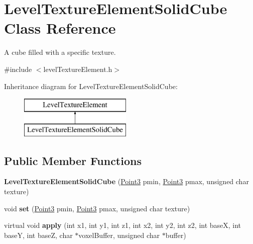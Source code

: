 \hypertarget{classLevelTextureElementSolidCube}{
\section{\-Level\-Texture\-Element\-Solid\-Cube \-Class \-Reference}
\label{d5/d61/classLevelTextureElementSolidCube}
}


\-A cube filled with a specific texture.  




{\ttfamily \#include $<$level\-Texture\-Element.\-h$>$}

\-Inheritance diagram for \-Level\-Texture\-Element\-Solid\-Cube\-:\begin{figure}[H]
\begin{center}
\leavevmode
\includegraphics[height=2.000000cm]{d5/d61/classLevelTextureElementSolidCube}
\end{center}
\end{figure}
\subsection*{\-Public \-Member \-Functions}
\begin{DoxyCompactItemize}
\item 
\hypertarget{classLevelTextureElementSolidCube_a1e3d82f5d320797f24e27606d634d088}{
{\bfseries \-Level\-Texture\-Element\-Solid\-Cube} (\hyperlink{classPoint3}{\-Point3} pmin, \hyperlink{classPoint3}{\-Point3} pmax, unsigned char texture)}
\label{d5/d61/classLevelTextureElementSolidCube_a1e3d82f5d320797f24e27606d634d088}

\item 
\hypertarget{classLevelTextureElementSolidCube_afa3ad50cf33843701072ed572b220e3a}{
void {\bfseries set} (\hyperlink{classPoint3}{\-Point3} pmin, \hyperlink{classPoint3}{\-Point3} pmax, unsigned char texture)}
\label{d5/d61/classLevelTextureElementSolidCube_afa3ad50cf33843701072ed572b220e3a}

\item 
\hypertarget{classLevelTextureElementSolidCube_a0feb1776b7133cefa71dc01714758b1a}{
virtual void {\bfseries apply} (int x1, int y1, int z1, int x2, int y2, int z2, int base\-X, int base\-Y, int base\-Z, char $\ast$voxel\-Buffer, unsigned char $\ast$buffer)}
\label{d5/d61/classLevelTextureElementSolidCube_a0feb1776b7133cefa71dc01714758b1a}

\end{DoxyCompactItemize}
